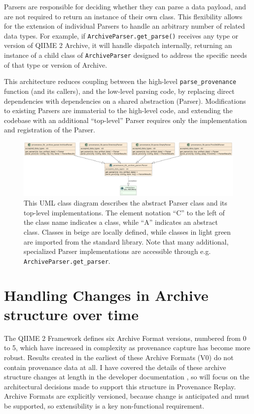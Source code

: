 Parsers are responsible for deciding whether they can parse a data payload, and
are not required to return an instance of their own class. This flexibility
allows for the extension of individual Parsers to handle an arbitrary number of
related data types. For example, if \texttt{ArchiveParser.get\_parse()} receives any type
or version of QIIME 2 Archive, it will handle dispatch internally, returning an
instance of a child class of \texttt{ArchiveParser} designed to address the specific
needs of that type or version of Archive.

This architecture reduces coupling between the high-level \texttt{parse\_provenance}
function (and its callers), and the low-level parsing code, by replacing direct
dependencies with dependencies on a shared abstraction (Parser). Modifications
to existing Parsers are immaterial to the high-level code, and extending the
codebase with an additional “top-level” Parser requires only the implementation
and registration of the Parser. 

\begin{figure}[htp]
\centering
\includegraphics[width=\textwidth]{figures/allParsersUML.png}
\caption[UML Class diagram of the abstract Parser class and its implementations]%
{This UML class diagram describes the abstract Parser class and its top-level
implementations. The element notation “C” to the left of the class name
indicates a class, while “A” indicates an abstract class. Classes in beige are
locally defined, while classes in light green are imported from the standard
library. Note that many additional, specialized Parser implementations are
accessible through e.g. \texttt{ArchiveParser.get\_parser}.}
\label{fig:allParsersUML}
\end{figure}


\section{Handling Changes in Archive structure over time}

The QIIME 2 Framework defines six Archive Format versions, numbered from 0 to 5,
which have increased in complexity as provenance capture has become more robust.
Results created in the earliest of these Archive Formats (V0) do not contain
provenance data at all. I have covered the details of these archive structure
changes at length in the developer documentation \parencite{qiime_2_development_team_archive_2018},
so will focus on the architectural decisions made to support this structure in
Provenance Replay.  Archive Formats are explicitly versioned, because change is
anticipated and must be supported, so extensibility is a key non-functional
requirement.

